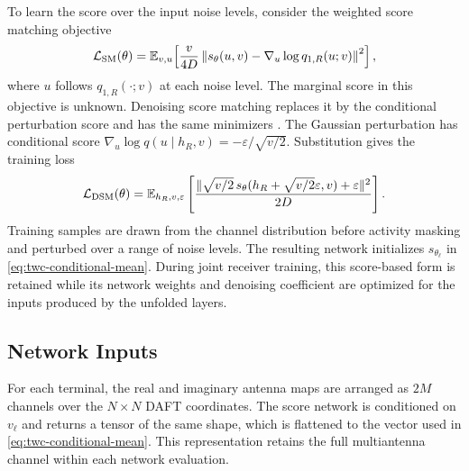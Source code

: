 To learn the score over the input noise levels, consider the
weighted score matching objective \cite{cai2026}
\begin{equation}
 \mathcal L_{\rm SM}(\theta)
 =\mathbb{E}_{v,u}\!\left[
 \frac{v}{4D}\left\|s_\theta(u,v)
       -\nabla_u\log q_{1,R}(u;v)\right\|^2\right],
 \label{eq:twc-score-matching}
\end{equation}
where $u$ follows $q_{1,R}(\cdot;v)$ at each noise level.
The marginal score in this objective is unknown. Denoising score
matching replaces it by the conditional perturbation score and has
the same minimizers \cite{vincent2011,song2019}.
The Gaussian perturbation has conditional score
$\nabla_u\log q(u\mid h_R,v)=-\varepsilon/\sqrt{v/2}$.
Substitution gives the training loss
\begin{equation}
 \mathcal L_{\rm DSM}(\theta)=\mathbb{E}_{h_R,v,\varepsilon}
 \left[\frac{\|\sqrt{v/2}\,s_\theta(h_R+\sqrt{v/2}\varepsilon,v)
                      +\varepsilon\|^2}{2D}\right].
 \label{eq:twc-dsm}
\end{equation}
Training samples are drawn from the channel distribution before
activity masking and perturbed over a range of noise levels.
The resulting network initializes $s_{\theta_\ell}$ in
\eqref{eq:twc-conditional-mean}. During joint receiver training, this
score-based form is retained while its network weights and denoising
coefficient are optimized for the inputs produced by the unfolded
layers.

\subsection{Network Inputs}

For each terminal, the real and imaginary antenna maps are arranged
as $2M$ channels over the $N\times N$ DAFT coordinates. The score
network is conditioned on $v_\ell$ and returns a tensor of the same
shape, which is flattened to the vector used in
\eqref{eq:twc-conditional-mean}. This representation retains the full
multiantenna channel within each network evaluation.

